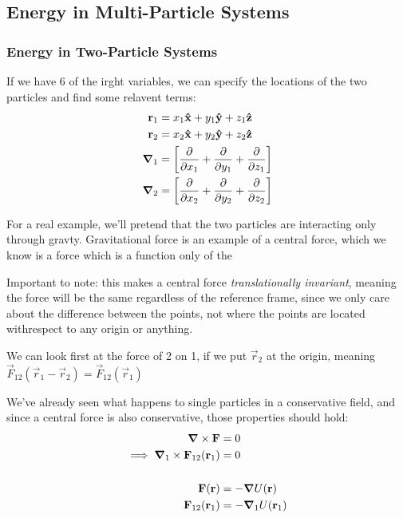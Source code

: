 \documentclass[a4paper]{article}
\begin{document}
\subsection{Energy in Multi-Particle Systems}
\subsubsection{Energy in Two-Particle Systems}

\begin{figure}
    \centering
\end{figure}

If we have 6 of the irght variables, we can specify the locations of the
two particles and find some relavent terms:
\begin{align*}
	\vec{r}_1 &= x_1\x+y_1\y+z_1\z\\
	\vec{r}_2 &= x_2\x+y_2\y+z_2\z\\
	\del_1 &= \left[\pd{x_1}+\pd{y_1}+\pd{z_1}\right]\\
	\del_2 &= \left[\pd{x_2}+\pd{y_2}+\pd{z_2}\right]
\end{align*}

For a real example, we'll pretend that the two particles are interacting only
through gravty. Gravitational force is an example of a central force,
which we know is a force which is a function only of the

Important to note: this makes a central force \emph{translationally invariant},
meaning the force will be the same regardless of the reference frame, since
we only care about the difference between the points, not where the points are
located withrespect to any origin or anything.

We can look first at the force of 2 on 1, if we put
$\vec{r}_2$ at the origin, meaning
$\vec{F}_{12}(\vec{r}_1-\vec{r}_2) = \vec{F}_{12}(\vec{r}_1)$

We've already seen what happens to single particles in a conservative field,
and since a central force is also conservative, those properties should hold:
\begin{align*}
	\boldsymbol{\mathbf{\nabla}}\times\boldsymbol{\mathbf{F}} &= 0\\
	\implies \boldsymbol{\mathbf{\nabla}}_1\times\boldsymbol{\mathbf{F}}_{12}(\boldsymbol{\mathbf{r}}_1) &= 0\\~\\
	\boldsymbol{\mathbf{F}}(\boldsymbol{\mathbf{r}}) &= -\boldsymbol{\mathbf{\nabla}} U(\boldsymbol{\mathbf{r}})\\
	\boldsymbol{\mathbf{F}}_{12}(\boldsymbol{\mathbf{r}}_1) &= -\boldsymbol{\mathbf{\nabla}}_1 U(\boldsymbol{\mathbf{r}}_1)
\end{align*}
\end{document}
